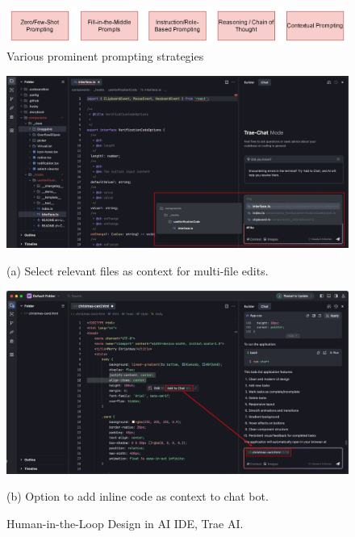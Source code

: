 \vspace{1cm}

\begin{figure}
    \centering
    \includegraphics[width=0.8\linewidth]{fig/prompt_strats.png}
    \caption{Various prominent prompting strategies}
    \label{fig:prompt}
\end{figure}

\begin{figure}[h]
    \centering
    \begin{minipage}[t]{0.8\textwidth}
        \centering
        \includegraphics[width=1\linewidth]{fig/trae-1.png} %
        \caption*{(a) Select relevant files as context for multi-file edits.} %
        \vspace{0.5cm}
    \end{minipage}
    \begin{minipage}[t]{0.8\textwidth}
        \centering
        \includegraphics[width=1\linewidth]{fig/trae-2.png} %
        \caption*{(b) Option to add inline code as context to chat bot.} %
    \end{minipage}
    \caption{Human-in-the-Loop Design in AI IDE, Trae AI.}
    \label{fig:trae}
\end{figure}

